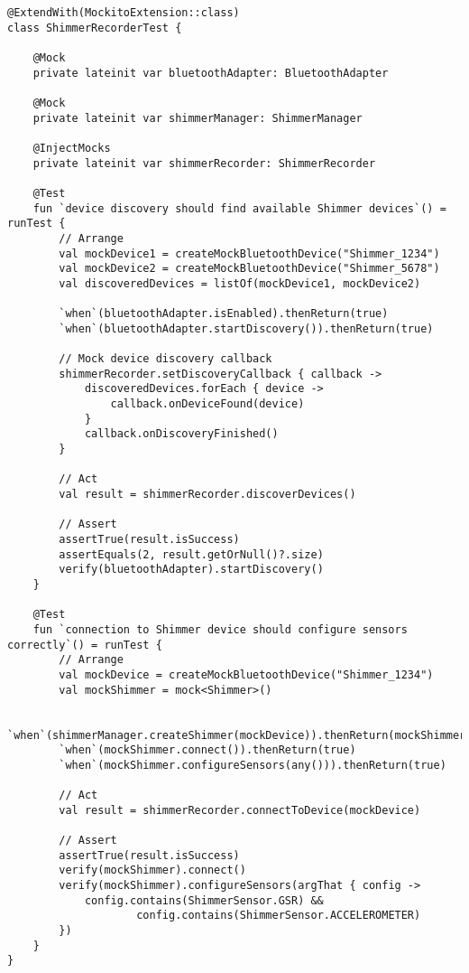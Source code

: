 \documentclass[11pt,a4paper]{report}
\begin{document}
\begin{verbatim}
@ExtendWith(MockitoExtension::class)
class ShimmerRecorderTest {

    @Mock
    private lateinit var bluetoothAdapter: BluetoothAdapter

    @Mock
    private lateinit var shimmerManager: ShimmerManager

    @InjectMocks
    private lateinit var shimmerRecorder: ShimmerRecorder

    @Test
    fun `device discovery should find available Shimmer devices`() = runTest {
        // Arrange
        val mockDevice1 = createMockBluetoothDevice("Shimmer_1234")
        val mockDevice2 = createMockBluetoothDevice("Shimmer_5678")
        val discoveredDevices = listOf(mockDevice1, mockDevice2)

        `when`(bluetoothAdapter.isEnabled).thenReturn(true)
        `when`(bluetoothAdapter.startDiscovery()).thenReturn(true)

        // Mock device discovery callback
        shimmerRecorder.setDiscoveryCallback { callback ->
            discoveredDevices.forEach { device ->
                callback.onDeviceFound(device)
            }
            callback.onDiscoveryFinished()
        }

        // Act
        val result = shimmerRecorder.discoverDevices()

        // Assert
        assertTrue(result.isSuccess)
        assertEquals(2, result.getOrNull()?.size)
        verify(bluetoothAdapter).startDiscovery()
    }

    @Test
    fun `connection to Shimmer device should configure sensors correctly`() = runTest {
        // Arrange
        val mockDevice = createMockBluetoothDevice("Shimmer_1234")
        val mockShimmer = mock<Shimmer>()

        `when`(shimmerManager.createShimmer(mockDevice)).thenReturn(mockShimmer)
        `when`(mockShimmer.connect()).thenReturn(true)
        `when`(mockShimmer.configureSensors(any())).thenReturn(true)

        // Act
        val result = shimmerRecorder.connectToDevice(mockDevice)

        // Assert
        assertTrue(result.isSuccess)
        verify(mockShimmer).connect()
        verify(mockShimmer).configureSensors(argThat { config ->
            config.contains(ShimmerSensor.GSR) &&
                    config.contains(ShimmerSensor.ACCELEROMETER)
        })
    }
}
\end{verbatim}
\end{document}
